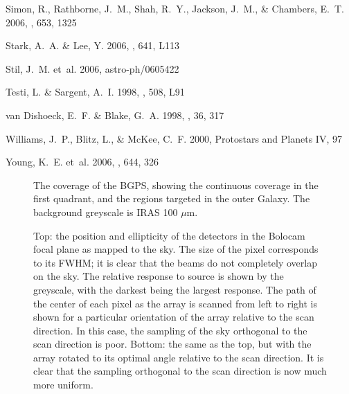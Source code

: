 \documentclass[12pt,preprint]{aastex}
\newcommand{\mum}{\ensuremath{\mu \mathrm{m}}}
\def\Figure#1#2#3#4{
\begin{figure}[htb]
\epsscale{#4}
\plotone{#1}
\caption{#2}
\label{#3}
\end{figure}
}
\begin{document}
\begin{thebibliography}{61}
{Simon}, R., {Rathborne}, J.~M., {Shah}, R.~Y., {Jackson}, J.~M., \&
  {Chambers}, E.~T. 2006{}, \apj, 653, 1325

{Stark}, A.~A. \& {Lee}, Y. 2006, \apjl, 641, L113

{Stil}, J.~M. {et~al.} 2006, astro-ph/0605422

{Testi}, L. \& {Sargent}, A.~I. 1998, \apjl, 508, L91

{van Dishoeck}, E.~F. \& {Blake}, G.~A. 1998, \araa, 36, 317

{Williams}, J.~P., {Blitz}, L., \& {McKee}, C.~F. 2000, Protostars and Planets
  IV, 97

{Young}, K.~E. {et~al.} 2006, \apj, 644, 326

\end{thebibliography}


\pagebreak

\Figure{f1}%
{The coverage of the BGPS, showing the continuous coverage in the
first quadrant, and the regions targeted in the outer Galaxy.  The
background greyscale is IRAS 100 \mum.}{fig:Coverage}{1.0}

\Figure{f2}%
{Top: the position and ellipticity of the detectors in the Bolocam
focal plane as mapped to the sky.  The size of the pixel corresponds
to its FWHM; it is clear that the beams do not completely overlap on
the sky.  The relative response to source is shown by the greyscale,
with the darkest being the largest response.  The path of the center
of each pixel as the array is scanned from left to right is shown for
a particular orientation of the array relative to the scan direction.
In this case, the sampling of the sky orthogonal to the scan direction
is poor.  Bottom: the same as the top, but with the array rotated to
its optimal angle relative to the scan direction.  It is clear that
the sampling orthogonal to the scan direction is now much more
uniform.}{fig:Array}{0.7}
\end{document}
